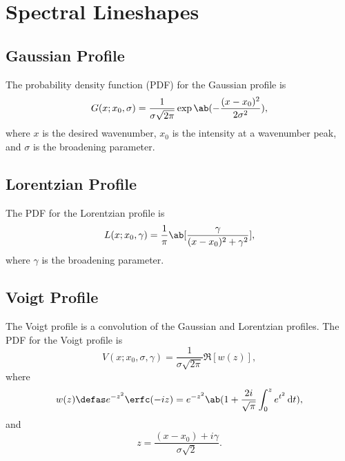 \chapter{Spectral Lineshapes}
\label{c:spectral_lineshapes}

\section{Gaussian Profile}
\label{s:gaussian_profile}

The probability density function (PDF) for the Gaussian profile is
\begin{equation*}
    G(x; x_{0}, \sigma) = \frac{1}{\sigma\sqrt{2\pi}}\exp\ab(-\frac{(x - x_{0})^{2}}{2\sigma^{2}}),
\end{equation*}
where $x$ is the desired wavenumber, $x_{0}$ is the intensity at a wavenumber peak, and $\sigma$ is the broadening parameter.

\section{Lorentzian Profile}
\label{s:lorentzian_profile}

The PDF for the Lorentzian profile is
\begin{equation*}
    L(x; x_{0}, \gamma) = \frac{1}{\pi}\ab[\frac{\gamma}{(x - x_{0})^{2} + \gamma^{2}}],
\end{equation*}
where $\gamma$ is the broadening parameter.

\section{Voigt Profile}
\label{s:voigt_profile}

The Voigt profile is a convolution of the Gaussian and Lorentzian profiles. The PDF for the Voigt profile is
\begin{equation*}
    V(x; x_{0}, \sigma, \gamma) = \frac{1}{\sigma\sqrt{2\pi}}\Re[w(z)],
\end{equation*}
where
\begin{equation*}
    w(z) \defas e^{-z^{2}}\erfc(-iz) = e^{-z^{2}}\ab(1 +
    \frac{2i}{\sqrt{\pi}}\int_{0}^{z} e^{t^{2}} \odif{t}),
\end{equation*}
and
\begin{equation*}
    z = \frac{(x - x_{0}) + i\gamma}{\sigma\sqrt{2}}.
\end{equation*}


